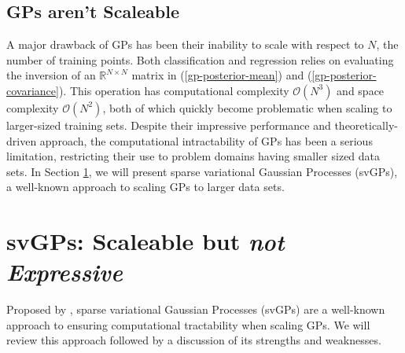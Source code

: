 \documentclass{article}
\numberwithin{equation}{section}
\begin{document}
\subsection{GPs aren't Scaleable}\label{section:gp-problems}
A major drawback of GPs has been their inability to scale with respect to $N$, the number of training points. Both classification and regression relies on evaluating the inversion of an $\mathbb{R}^{N \times N}$ matrix in (\ref{gp-posterior-mean}) and (\ref{gp-posterior-covariance}). This operation has computational complexity $\mathcal{O}(N^3)$ and space complexity $\mathcal{O}(N^2)$, both of which quickly become problematic when scaling to larger-sized training sets. Despite their impressive performance and theoretically-driven approach, the computational intractability of GPs has been a serious limitation, restricting their use to problem domains having smaller sized data sets. In Section \ref{section:the-svgp}, we will present sparse variational Gaussian Processes (svGPs), a well-known approach to scaling GPs to larger data sets.

\newpage
\section{svGPs: Scaleable but \textit{not Expressive}}\label{section:the-svgp}
Proposed by \cite{titsias2009variational}, sparse variational Gaussian Processes (svGPs) are a well-known approach to ensuring computational tractability when scaling GPs. We will review this approach followed by a discussion of its strengths and weaknesses.
\end{document}
